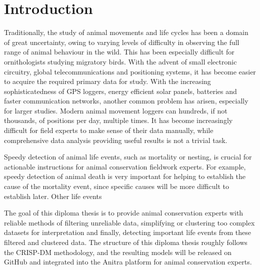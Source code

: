 \chapter*{Introduction}

Traditionally, the study of animal movements and life cycles has been a domain of great uncertainty, owing to varying levels of difficulty in observing the full range of animal behaviour in the wild. This has been especially difficult for ornithologists studying migratory birds. With the advent of small electronic circuitry, global telecommunications and positioning systems, it has become easier to acquire the required primary data for study. With the increasing sophisticatedness of GPS loggers, energy efficient solar panels, batteries and faster communication networks, another common problem has arisen, especially for larger studies. Modern animal movement loggers can hundreds, if not thousands, of positions per day, multiple times. It has become increasingly difficult for field experts to make sense of their data manually, while comprehensive data analysis providing useful results is not a trivial task.

Speedy detection of animal life events, such as mortality or nesting, is crucial for actionable instructions for animal conservation fieldwork experts. For example, speedy detection of animal death is very important for helping to establish the cause of the mortality event, since specific causes will be more difficult to establish later. Other life events

The goal of this diploma thesis is to provide animal conservation experts with reliable methods of filtering unreliable data, simplifying or clustering too complex datasets for interpretation and finally, detecting important life events from these filtered and clustered data. The structure of this diploma thesis roughly follows the CRISP-DM methodology, and the resulting models will be released on GitHub and integrated into the Anitra platform for animal conservation experts.
